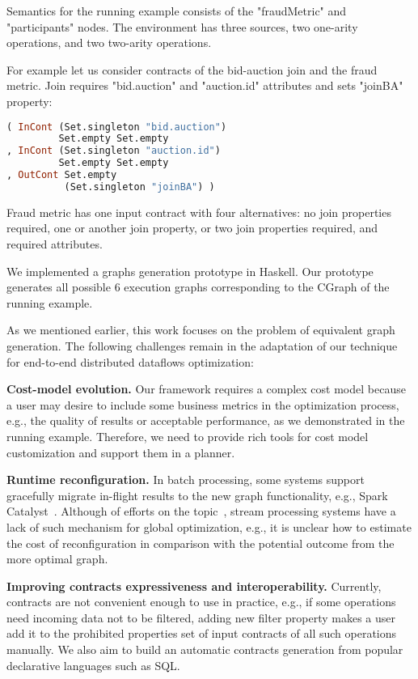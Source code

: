 Semantics for the running example consists of the "fraudMetric" and "participants" nodes.
The environment has three sources, two one-arity operations, and two two-arity operations.

For example let us consider contracts of the bid-auction join and the fraud metric.
Join requires "bid.auction" and "auction.id" attributes and sets "joinBA" property:
\begin{lstlisting}[language=Haskell]
( InCont (Set.singleton "bid.auction")
         Set.empty Set.empty
, InCont (Set.singleton "auction.id")
         Set.empty Set.empty
, OutCont Set.empty
          (Set.singleton "joinBA") )
\end{lstlisting}

Fraud metric has one input contract with four alternatives: no join properties required, one or another join property, or two join properties required, and required attributes.

We implemented a graphs generation prototype in Haskell.
Our prototype generates all possible 6 execution graphs corresponding to the CGraph of the running example.

As we mentioned earlier, this work focuses on the problem of equivalent graph generation. The following challenges remain in the adaptation of our technique for end-to-end distributed dataflows optimization:

\textbf{Cost-model evolution.}
Our framework requires a complex cost model because a user may desire to include some business metrics in the optimization process, e.g., the quality of results or acceptable performance, as we demonstrated in the running example. Therefore, we need to provide rich tools for cost model customization and support them in a planner. 

\textbf{Runtime reconfiguration.}
In batch processing, some systems support gracefully migrate in-flight results to the new graph functionality, e.g., Spark Catalyst~\cite{armbrust2015spark}. Although of efforts on the topic~\cite{10.14778/3329772.3329777, grulich2020grizzly}, stream processing systems have a lack of such mechanism for global optimization, e.g., it is unclear how to estimate the cost of reconfiguration in comparison with the potential outcome from the more optimal graph.

\textbf{Improving contracts expressiveness and interoperability.}
Currently, contracts are not convenient enough to use in practice, e.g., if some operations need incoming data not to be filtered, adding new filter property makes a user add it to the prohibited properties set of input contracts of all such operations manually. We also aim to build an automatic contracts generation from popular declarative languages such as SQL.